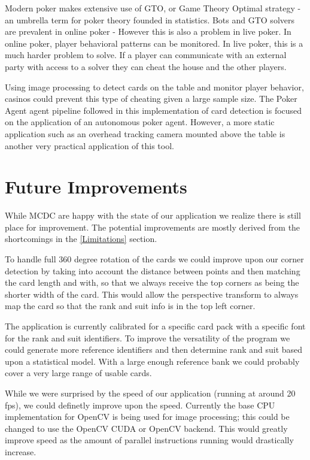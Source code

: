 \documentclass[conference]{IEEEtran}
\begin{document}
Modern poker makes extensive use of GTO, or Game Theory Optimal strategy - an umbrella term for
poker theory founded in statistics. Bots and GTO solvers are prevalent in online poker - However
this is also a problem in live poker. In online poker, player behavioral patterns can be monitored.
In live poker, this is a much harder problem to solve. If a player can communicate with an external
party with access to a solver they can cheat the house and the other players.

Using image processing to detect cards on the table and monitor player behavior, casinos could
prevent this type of cheating given a large sample size. The Poker Agent agent pipeline followed in
this implementation of card detection is focused on the application of an autonomous poker agent.
However, a more static application such as an overhead tracking camera mounted above the table is
another very practical application of this tool.

\section{Future Improvements}
While MCDC are happy with the state of our application we realize there is still place for
improvement. The potential improvements are mostly derived from the shortcomings in the
\ref{Limitations} section.

To handle full 360 degree rotation of the cards we could improve upon our corner detection by taking
into account the distance between points and then matching the card length and with, so that we
always receive the top corners as being the shorter width of the card. This would allow the
perspective transform to always map the card so that the rank and suit info is in the top left
corner.

The application is currently calibrated for a specific card pack with a specific font for the rank
and suit identifiers. To improve the versatility of the program we could generate more reference
identifiers and then determine rank and suit based upon a statistical model. With a large enough
reference bank we could probably cover a very large range of usable cards.

While we were surprised by the speed of our application (running at around 20 fps), we could
definetly improve upon the speed. Currently the base CPU implementation for OpenCV is being used for
image processing; this could be changed to use the OpenCV CUDA or OpenCV backend. This would greatly
improve speed as the amount of parallel instructions running would drastically increase.
\end{document}
